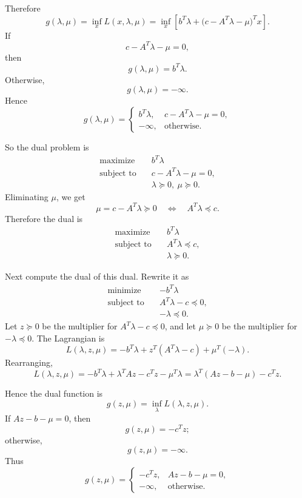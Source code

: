 \documentclass[11pt,letter,notitlepage]{article}
\theoremstyle{definition}
\begin{document}
\begin{solution}
\begin{enumerate}
    Therefore
    \[
    g(\lambda,\mu)=\inf_x L(x,\lambda,\mu)
    =\inf_x\left[b^T\lambda+\bigl(c-A^T\lambda-\mu\bigr)^T x\right].
    \]
    If
    \[
    c-A^T\lambda-\mu=0,
    \]
    then
    \[
    g(\lambda,\mu)=b^T\lambda.
    \]
    Otherwise,
    \[
    g(\lambda,\mu)=-\infty.
    \]
    Hence
    \[
    g(\lambda,\mu)=
    \begin{cases}
        b^T\lambda, & c-A^T\lambda-\mu=0,\\
        -\infty, & \text{otherwise}.
    \end{cases}
    \]

    So the dual problem is
    \[
    \begin{aligned}
        \text{maximize}\quad & b^T\lambda\\
        \text{subject to}\quad & c-A^T\lambda-\mu=0,\\
        & \lambda \succeq 0,\ \mu \succeq 0.
    \end{aligned}
    \]
    Eliminating $\mu$, we get
    \[
    \mu=c-A^T\lambda \succeq 0
    \quad\Longleftrightarrow\quad
    A^T\lambda \preceq c.
    \]
    Therefore the dual is
    \[
    \begin{aligned}
        \text{maximize}\quad & b^T\lambda\\
        \text{subject to}\quad & A^T\lambda \preceq c,\\
        & \lambda \succeq 0.
    \end{aligned}
    \]

    Next compute the dual of this dual. Rewrite it as
    \[
    \begin{aligned}
        \text{minimize}\quad & -b^T\lambda\\
        \text{subject to}\quad & A^T\lambda-c \preceq 0,\\
        & -\lambda \preceq 0.
    \end{aligned}
    \]
    Let $z \succeq 0$ be the multiplier for $A^T\lambda-c\preceq 0$, and
    let $\mu \succeq 0$ be the multiplier for $-\lambda\preceq 0$. The
    Lagrangian is
    \[
    L(\lambda,z,\mu)
    =-b^T\lambda+z^T(A^T\lambda-c)+\mu^T(-\lambda).
    \]
    Rearranging,
    \[
    L(\lambda,z,\mu)
    =-b^T\lambda+\lambda^T A z-c^T z-\mu^T\lambda
    =\lambda^T(Az-b-\mu)-c^T z.
    \]

    Hence the dual function is
    \[
    g(z,\mu)=\inf_\lambda L(\lambda,z,\mu).
    \]
    If $Az-b-\mu=0$, then
    \[
    g(z,\mu)=-c^T z;
    \]
    otherwise,
    \[
    g(z,\mu)=-\infty.
    \]
    Thus
    \[
    g(z,\mu)=
    \begin{cases}
        -c^T z, & Az-b-\mu=0,\\
        -\infty, & \text{otherwise}.
    \end{cases}
    \]


\end{enumerate}
\end{solution}
\end{document}
